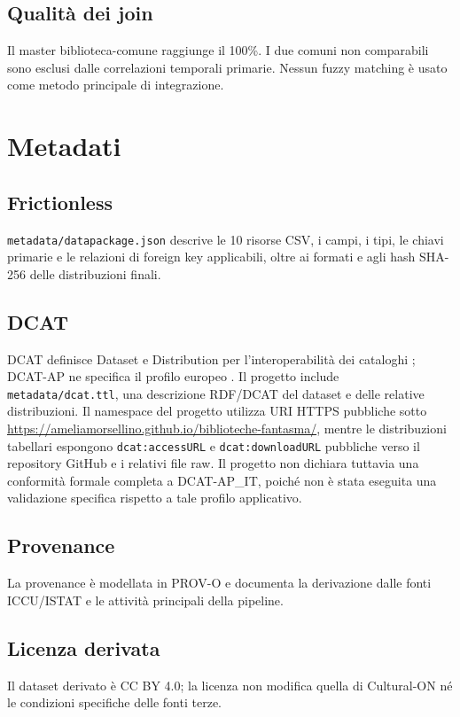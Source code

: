 \documentclass[11pt,a4paper]{article}
\begin{document}
\subsection{Qualità dei join}
Il master biblioteca-comune raggiunge il 100\%. I due comuni non comparabili sono esclusi dalle correlazioni temporali primarie. Nessun fuzzy matching è usato come metodo principale di integrazione.

\section{Metadati}
\subsection{Frictionless}
\texttt{metadata/datapackage.json} descrive le 10 risorse CSV, i campi, i tipi, le chiavi primarie e le relazioni di foreign key applicabili, oltre ai formati e agli hash SHA-256 delle distribuzioni finali.

\subsection{DCAT}
DCAT definisce Dataset e Distribution per l'interoperabilità dei cataloghi \cite{dcat3}; DCAT-AP ne specifica il profilo europeo \cite{dcatap}. Il progetto include \texttt{metadata/dcat.ttl}, una descrizione RDF/DCAT del dataset e delle relative distribuzioni. Il namespace del progetto utilizza URI HTTPS pubbliche sotto \url{https://ameliamorsellino.github.io/biblioteche-fantasma/}, mentre le distribuzioni tabellari espongono \texttt{dcat:accessURL} e \texttt{dcat:downloadURL} pubbliche verso il repository GitHub e i relativi file raw. Il progetto non dichiara tuttavia una conformità formale completa a DCAT-AP\_IT, poiché non è stata eseguita una validazione specifica rispetto a tale profilo applicativo.

\subsection{Provenance}
La provenance è modellata in PROV-O \cite{provo} e documenta la derivazione dalle fonti ICCU/ISTAT e le attività principali della pipeline.

\subsection{Licenza derivata}
Il dataset derivato è CC BY 4.0; la licenza non modifica quella di Cultural-ON né le condizioni specifiche delle fonti terze.
\end{document}

